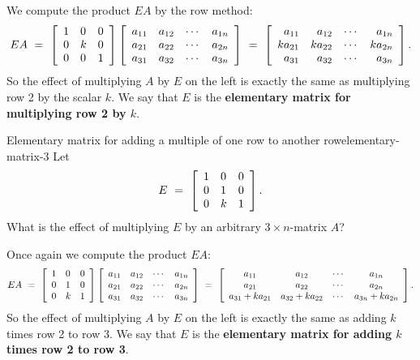 \documentclass{ximera}
\begin{document}
\begin{solution}
  We compute the product $EA$ by the row method:
  \begin{equation*}
    EA ~=~ \startmat{lll}
      1 & 0 & 0 \\
      0 & k & 0 \\
      0 & 0 & 1 \\
    \stopmat
    \startmat{cccc}
      a_{11} & a_{12} & \cdots & a_{1n} \\
      a_{21} & a_{22} & \cdots & a_{2n} \\
      a_{31} & a_{32} & \cdots & a_{3n} \\
    \stopmat
    ~=~
    \startmat{rrrr}
      a_{11} & a_{12} & \cdots & a_{1n} \\
      ka_{21} & ka_{22} & \cdots & ka_{2n} \\
      a_{31} & a_{32} & \cdots & a_{3n} \\
    \stopmat.
  \end{equation*}
  So the effect of multiplying $A$ by $E$ on the left is exactly the
  same as multiplying row 2 by the scalar $k$. We say that $E$ is the
  \textbf{elementary matrix for multiplying row 2 by $k$}.
\end{solution}

\begin{example}{Elementary matrix for adding a multiple of one row to another row}{elementary-matrix-3}
  Let
  \begin{equation*}
    E ~=~ \startmat{lll}
      1 & 0 & 0 \\
      0 & 1 & 0 \\
      0 & k & 1 \\
    \stopmat.
  \end{equation*}
  What is the effect of multiplying $E$ by an arbitrary $3\times
  n$-matrix $A$?
\end{example}

\begin{solution}
  Once again we compute the product $EA$:
  \begin{equation*}
    EA ~=~ \startmat{lll}
      1 & 0 & 0 \\
      0 & 1 & 0 \\
      0 & k & 1 \\
    \stopmat
    \startmat{cccc}
      a_{11} & a_{12} & \cdots & a_{1n} \\
      a_{21} & a_{22} & \cdots & a_{2n} \\
      a_{31} & a_{32} & \cdots & a_{3n} \\
    \stopmat
    ~=~
    \startmat{cccc}
      a_{11} & a_{12} & \cdots & a_{1n} \\
      a_{21} & a_{22} & \cdots & a_{2n} \\
      a_{31}+ka_{21} & a_{32}+ka_{22} & \cdots & a_{3n}+ka_{2n} \\
    \stopmat.
  \end{equation*}
  So the effect of multiplying $A$ by $E$ on the left is exactly the
  same as adding $k$ times row 2 to row 3. We say that $E$ is the
  \textbf{elementary matrix for adding $k$ times row 2 to row 3}.
\end{solution}
\end{document}
